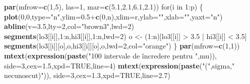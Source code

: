 \documentclass[]{article}
\newenvironment{Shaded}{\begin{snugshade}}{\end{snugshade}}
\newcommand{\KeywordTok}[1]{\textcolor[rgb]{0.13,0.29,0.53}{\textbf{{#1}}}}
\newcommand{\DataTypeTok}[1]{\textcolor[rgb]{0.13,0.29,0.53}{{#1}}}
\newcommand{\DecValTok}[1]{\textcolor[rgb]{0.00,0.00,0.81}{{#1}}}
\newcommand{\FloatTok}[1]{\textcolor[rgb]{0.00,0.00,0.81}{{#1}}}
\newcommand{\StringTok}[1]{\textcolor[rgb]{0.31,0.60,0.02}{{#1}}}
\newcommand{\OtherTok}[1]{\textcolor[rgb]{0.56,0.35,0.01}{{#1}}}
\newcommand{\NormalTok}[1]{{#1}}
\begin{document}
\begin{Shaded}
\begin{Highlighting}[]
\KeywordTok{par}\NormalTok{(}\DataTypeTok{mfrow=}\KeywordTok{c}\NormalTok{(}\DecValTok{1}\NormalTok{,}\DecValTok{5}\NormalTok{), }\DataTypeTok{las=}\DecValTok{1}\NormalTok{, }\DataTypeTok{mar=}\KeywordTok{c}\NormalTok{(}\FloatTok{5.1}\NormalTok{,}\FloatTok{2.1}\NormalTok{,}\FloatTok{6.1}\NormalTok{,}\FloatTok{2.1}\NormalTok{))}
\NormalTok{for(i in }\DecValTok{1}\NormalTok{:p) \{}
  \KeywordTok{plot}\NormalTok{(}\DecValTok{0}\NormalTok{,}\DecValTok{0}\NormalTok{,}\DataTypeTok{type=}\StringTok{"n"}\NormalTok{,}\DataTypeTok{ylim=}\FloatTok{0.5}\NormalTok{+}\KeywordTok{c}\NormalTok{(}\DecValTok{0}\NormalTok{,n),}\DataTypeTok{xlim=}\NormalTok{r,}\DataTypeTok{ylab=}\StringTok{""}\NormalTok{,}\DataTypeTok{xlab=}\StringTok{""}\NormalTok{,}\DataTypeTok{yaxt=}\StringTok{"n"}\NormalTok{)}
  \KeywordTok{abline}\NormalTok{(}\DataTypeTok{v=}\FloatTok{3.5}\NormalTok{,}\DataTypeTok{lty=}\DecValTok{2}\NormalTok{,}\DataTypeTok{col=}\StringTok{"brown3"}\NormalTok{,}\DataTypeTok{lwd=}\DecValTok{2}\NormalTok{)}
  \KeywordTok{segments}\NormalTok{(lo3[[i]],}\DecValTok{1}\NormalTok{:n,hi3[[i]],}\DecValTok{1}\NormalTok{:n,}\DataTypeTok{lwd=}\DecValTok{2}\NormalTok{)}
  \NormalTok{o <-}\StringTok{ }\NormalTok{(}\DecValTok{1}\NormalTok{:n)[lo3[[i]] >}\StringTok{ }\FloatTok{3.5} \NormalTok{|}\StringTok{ }\NormalTok{hi3[[i]] <}\StringTok{ }\FloatTok{3.5}\NormalTok{]}
  \KeywordTok{segments}\NormalTok{(lo3[[i]][o],o,hi3[[i]][o],o,}\DataTypeTok{lwd=}\DecValTok{2}\NormalTok{,}\DataTypeTok{col=}\StringTok{"orange"}\NormalTok{)}
\NormalTok{\}}
\KeywordTok{par}\NormalTok{(}\DataTypeTok{mfrow=}\KeywordTok{c}\NormalTok{(}\DecValTok{1}\NormalTok{,}\DecValTok{1}\NormalTok{))}
\KeywordTok{mtext}\NormalTok{(}\KeywordTok{expression}\NormalTok{(}\KeywordTok{paste}\NormalTok{(}\StringTok{"100 intervale de încredere pentru "}\NormalTok{,mu)),}
      \DataTypeTok{side=}\DecValTok{3}\NormalTok{,}\DataTypeTok{cex=}\FloatTok{1.5}\NormalTok{,}\DataTypeTok{xpd=}\OtherTok{TRUE}\NormalTok{,}\DataTypeTok{line=}\DecValTok{4}\NormalTok{)}
\KeywordTok{mtext}\NormalTok{(}\KeywordTok{expression}\NormalTok{(}\KeywordTok{paste}\NormalTok{(}\StringTok{"("}\NormalTok{,sigma,}\StringTok{" necunoscut)"}\NormalTok{)),}
      \DataTypeTok{side=}\DecValTok{3}\NormalTok{,}\DataTypeTok{cex=}\FloatTok{1.3}\NormalTok{,}\DataTypeTok{xpd=}\OtherTok{TRUE}\NormalTok{,}\DataTypeTok{line=}\FloatTok{2.7}\NormalTok{)}
\end{Highlighting}
\end{Shaded}
\end{document}

